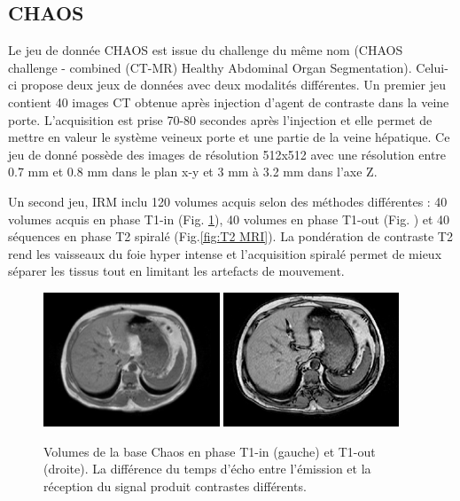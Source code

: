 \subsection{CHAOS}

Le jeu de donnée CHAOS est issue du challenge du même nom (CHAOS challenge - combined (CT-MR) Healthy Abdominal Organ Segmentation). Celui-ci propose deux jeux de données avec deux modalités différentes. Un premier jeu contient 40 images CT obtenue après injection d'agent de contraste dans la veine porte. L'acquisition est prise 70-80 secondes après l'injection et elle permet de mettre en valeur le système veineux porte et une partie de la veine hépatique. Ce jeu de donné possède des images de résolution 512x512 avec une résolution entre 0.7 mm et 0.8 mm dans le plan x-y et 3 mm à 3.2 mm dans l'axe Z.

Un second jeu, IRM inclu 120 volumes acquis selon des méthodes différentes : 40 volumes acquis en phase T1-in (Fig. \ref{fig:T1 MRI}), 40 volumes  en phase T1-out (Fig. \cite{fig:T1 MRI}) et 40 séquences en phase T2 spiralé (Fig.\ref{fig:T2 MRI}). La pondération de contraste T2 rend les vaisseaux du foie hyper intense et l'acquisition spiralé permet de mieux séparer les tissus tout en limitant les artefacts de mouvement.

\begin{figure}
    \centering
    \includegraphics[height=4cm]{Images/T1_in_phase.png}
    \includegraphics[height=4cm]{Images/T1_out_phase.png}
    \caption{Volumes de la base Chaos en phase T1-in (gauche) et T1-out (droite). La différence du temps d'écho entre l'émission et la réception du signal produit contrastes différents.}
    \label{fig:T1 MRI}
\end{figure}

